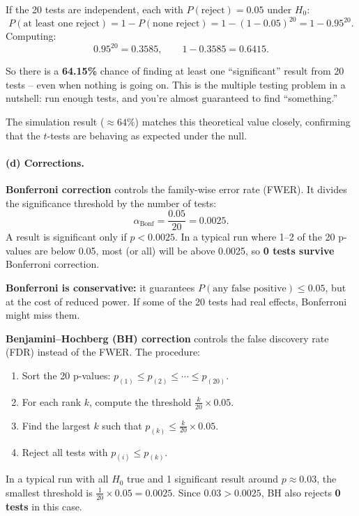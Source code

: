 \documentclass[11pt]{article}
\begin{document}
If the 20 tests are independent, each with $P(\text{reject}) = 0.05$ under $H_0$:
\[
  P(\text{at least one reject}) = 1 - P(\text{none reject}) = 1 - (1 - 0.05)^{20} = 1 - 0.95^{20}.
\]
Computing:
\[
  0.95^{20} = 0.3585, \qquad 1 - 0.3585 = \boxed{0.6415}.
\]

So there is a \textbf{64.15\%} chance of finding at least one ``significant'' result from 20 tests -- even when nothing is going on. This is the multiple testing problem in a nutshell: run enough tests, and you're almost guaranteed to find ``something.''

The simulation result ($\approx 64\%$) matches this theoretical value closely, confirming that the $t$-tests are behaving as expected under the null.

\paragraph{(d) Corrections.}

\textbf{Bonferroni correction} controls the family-wise error rate (FWER). It divides the significance threshold by the number of tests:
\[
  \alpha_{\text{Bonf}} = \frac{0.05}{20} = 0.0025.
\]
A result is significant only if $p < 0.0025$. In a typical run where 1--2 of the 20 p-values are below 0.05, most (or all) will be above 0.0025, so \textbf{0 tests survive} Bonferroni correction.

\textbf{Bonferroni is conservative:} it guarantees $P(\text{any false positive}) \leq 0.05$, but at the cost of reduced power. If some of the 20 tests had real effects, Bonferroni might miss them.

\textbf{Benjamini--Hochberg (BH) correction} controls the false discovery rate (FDR) instead of the FWER. The procedure:
\begin{enumerate}
  \item Sort the 20 p-values: $p_{(1)} \leq p_{(2)} \leq \cdots \leq p_{(20)}$.
  \item For each rank $k$, compute the threshold $\frac{k}{20} \times 0.05$.
  \item Find the largest $k$ such that $p_{(k)} \leq \frac{k}{20} \times 0.05$.
  \item Reject all tests with $p_{(i)} \leq p_{(k)}$.
\end{enumerate}

In a typical run with all $H_0$ true and 1 significant result around $p \approx 0.03$, the smallest threshold is $\frac{1}{20} \times 0.05 = 0.0025$. Since $0.03 > 0.0025$, BH also rejects \textbf{0 tests} in this case.
\end{document}
